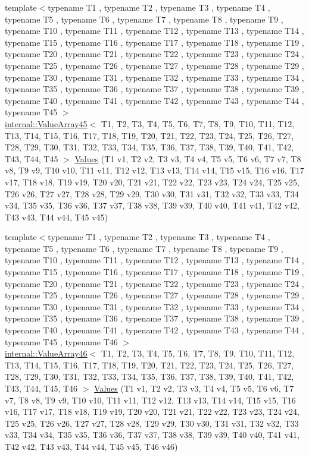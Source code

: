 \begin{DoxyCompactItemize}
\item 
{\footnotesize template$<$typename T1 , typename T2 , typename T3 , typename T4 , typename T5 , typename T6 , typename T7 , typename T8 , typename T9 , typename T10 , typename T11 , typename T12 , typename T13 , typename T14 , typename T15 , typename T16 , typename T17 , typename T18 , typename T19 , typename T20 , typename T21 , typename T22 , typename T23 , typename T24 , typename T25 , typename T26 , typename T27 , typename T28 , typename T29 , typename T30 , typename T31 , typename T32 , typename T33 , typename T34 , typename T35 , typename T36 , typename T37 , typename T38 , typename T39 , typename T40 , typename T41 , typename T42 , typename T43 , typename T44 , typename T45 $>$ }\\\mbox{\hyperlink{classtesting_1_1internal_1_1ValueArray45}{internal\+::\+Value\+Array45}}$<$ T1, T2, T3, T4, T5, T6, T7, T8, T9, T10, T11, T12, T13, T14, T15, T16, T17, T18, T19, T20, T21, T22, T23, T24, T25, T26, T27, T28, T29, T30, T31, T32, T33, T34, T35, T36, T37, T38, T39, T40, T41, T42, T43, T44, T45 $>$ \mbox{\hyperlink{namespacetesting_a227b4b3b251f5f4aa0e1261c27fe9dd4}{Values}} (T1 v1, T2 v2, T3 v3, T4 v4, T5 v5, T6 v6, T7 v7, T8 v8, T9 v9, T10 v10, T11 v11, T12 v12, T13 v13, T14 v14, T15 v15, T16 v16, T17 v17, T18 v18, T19 v19, T20 v20, T21 v21, T22 v22, T23 v23, T24 v24, T25 v25, T26 v26, T27 v27, T28 v28, T29 v29, T30 v30, T31 v31, T32 v32, T33 v33, T34 v34, T35 v35, T36 v36, T37 v37, T38 v38, T39 v39, T40 v40, T41 v41, T42 v42, T43 v43, T44 v44, T45 v45)
\item 
{\footnotesize template$<$typename T1 , typename T2 , typename T3 , typename T4 , typename T5 , typename T6 , typename T7 , typename T8 , typename T9 , typename T10 , typename T11 , typename T12 , typename T13 , typename T14 , typename T15 , typename T16 , typename T17 , typename T18 , typename T19 , typename T20 , typename T21 , typename T22 , typename T23 , typename T24 , typename T25 , typename T26 , typename T27 , typename T28 , typename T29 , typename T30 , typename T31 , typename T32 , typename T33 , typename T34 , typename T35 , typename T36 , typename T37 , typename T38 , typename T39 , typename T40 , typename T41 , typename T42 , typename T43 , typename T44 , typename T45 , typename T46 $>$ }\\\mbox{\hyperlink{classtesting_1_1internal_1_1ValueArray46}{internal\+::\+Value\+Array46}}$<$ T1, T2, T3, T4, T5, T6, T7, T8, T9, T10, T11, T12, T13, T14, T15, T16, T17, T18, T19, T20, T21, T22, T23, T24, T25, T26, T27, T28, T29, T30, T31, T32, T33, T34, T35, T36, T37, T38, T39, T40, T41, T42, T43, T44, T45, T46 $>$ \mbox{\hyperlink{namespacetesting_a8f5536906a9d6780467c8ae53a420dad}{Values}} (T1 v1, T2 v2, T3 v3, T4 v4, T5 v5, T6 v6, T7 v7, T8 v8, T9 v9, T10 v10, T11 v11, T12 v12, T13 v13, T14 v14, T15 v15, T16 v16, T17 v17, T18 v18, T19 v19, T20 v20, T21 v21, T22 v22, T23 v23, T24 v24, T25 v25, T26 v26, T27 v27, T28 v28, T29 v29, T30 v30, T31 v31, T32 v32, T33 v33, T34 v34, T35 v35, T36 v36, T37 v37, T38 v38, T39 v39, T40 v40, T41 v41, T42 v42, T43 v43, T44 v44, T45 v45, T46 v46)

\end{DoxyCompactItemize}
